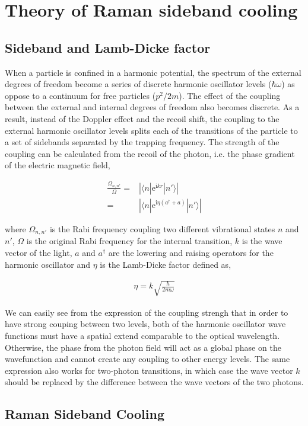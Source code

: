 \documentclass[aps,twocolumn,secnumarabic,balancelastpage,amsmath,amssymb,nofootinbib]{revtex4}
\newcommand{\ue}{\mathrm{e}}
\newcommand{\ui}{\mathrm{i}}
\newcommand{\eqar}[1]
{
  \begin{align*}
    #1
  \end{align*}
}
\newcommand{\paren}[1]{{\left({#1}\right)}}
\newcommand{\abs}[1]{{\left|{#1}\right|}}
\begin{document}
\section{Theory of Raman sideband cooling}
\subsection{Sideband and Lamb-Dicke factor}
When a particle is confined in a harmonic potential, the spectrum of the external degrees of freedom become a series of discrete harmonic oscillator levels ($\hbar\omega$) as oppose to a continuum for free particles ($p^2/2m$). The effect of the coupling between the external and internal degrees of freedom also becomes discrete. As a result, instead of the Doppler effect and the recoil shift, the coupling to the external harmonic oscillator levels splits each of the transitions of the particle to a set of sidebands separated by the trapping frequency. The strength of the coupling can be calculated from the recoil of the photon, i.e. the phase gradient of the electric magnetic field,
\eqar{
  \frac{\Omega_{n,n'}}{\Omega}=&\abs{\langle n|\ue^{\ui kr}|n'\rangle}\\
  =&\abs{\langle n|\ue^{\ui \eta\paren{a^\dagger+a}}|n'\rangle}
}
where $\Omega_{n,n'}$ is the Rabi frequency coupling two different vibrational states $n$ and $n'$, $\Omega$ is the original Rabi frequency for the internal transition, $k$ is the wave vector of the light, $a$ and $a^\dagger$ are the lowering and raising operators for the harmonic oscillator and $\eta$ is the Lamb-Dicke factor defined as,
\eqar{
  \eta=k\sqrt{\frac{\hbar}{2m\omega}}
}
We can easily see from the expression of the coupling strengh that in order to have strong couping between two levels, both of the harmonic oscillator wave functions must have a spatial extend comparable to the optical wavelength. Otherwise, the phase from the photon field will act as a global phase on the wavefunction and cannot create any coupling to other energy levels. The same expression also works for two-photon transitions, in which case the wave vector $k$ should be replaced by the difference between the wave vectors of the two photons.

\subsection{Raman Sideband Cooling}
\end{document}
